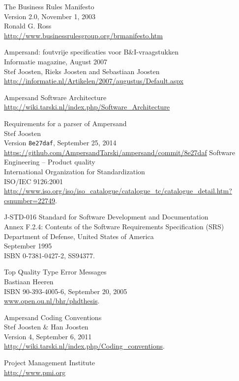 \label{sec:bibliography}

\begin{thebibliography}{99}

	The Business Rules Manifesto\\
	Version 2.0, November 1, 2003\\
	Ronald G. Ross\\
	\url{http://www.businessrulesgroup.org/brmanifesto.htm}

	Ampersand: foutvrije specificaties voor B\&I-vraagstukken\\
	Informatie magazine, August 2007\\
	Stef Joosten, Rieks Joosten and Sebastiaan Joosten\\
	\url{http://informatie.nl/Artikelen/2007/augustus/Default.aspx}  %

	Ampersand Software Architecture\\
	\url{http://wiki.tarski.nl/index.php/Software_Architecture}

	Requirements for a parser of Ampersand\\
	Stef Joosten\\
	Version \texttt{8e27daf}, September 25, 2014\\
	\url{https://github.com/AmpersandTarski/ampersand/commit/8e27daf}
	Software Engineering -- Product quality\\
	International Organization for Standardization\\
	ISO/IEC 9126:2001\\
	\url{http://www.iso.org/iso/iso_catalogue/catalogue_tc/catalogue_detail.htm?csnumber=22749}.

	J-STD-016 Standard for Software Development and Documentation\\
	Annex F.2.4: Contents of the Software Requirements Specification (SRS)\\
	Department of Defense, United States of America\\
	September 1995\\
	ISBN 0-7381-0427-2, SS94377.

	Top Quality Type Error Messages\\
	Bastiaan Heeren\\
	ISBN 90-393-4005-6, September 20, 2005\\
	\url{www.open.ou.nl/bhr/phdthesis}.

	Ampersand Coding Conventions\\
	Stef Joosten \& Han Joosten\\
	Version 4, September 6, 2011\\
	\url{http://wiki.tarski.nl/index.php/Coding\_conventions}.

	Project Management Institute\\
	\url{http://www.pmi.org}

\end{thebibliography}
